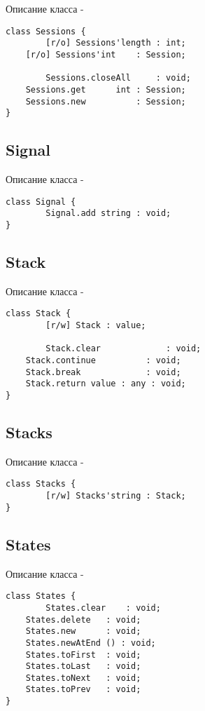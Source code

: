 \noindent Описание класса  -
\begin{lstlisting}[numbers=none]
class Sessions {
        [r/o] Sessions'length : int;
	[r/o] Sessions'int    : Session;
	
        Sessions.closeAll     : void;
	Sessions.get      int : Session;
	Sessions.new          : Session;
}
\end{lstlisting}

\subsection{{\color{orange} Signal}}

\noindent Описание класса  -
\begin{lstlisting}[numbers=none]
class Signal {
        Signal.add string : void;
}
\end{lstlisting}

\subsection{{\color{orange} Stack}}

\noindent Описание класса  -
\begin{lstlisting}[numbers=none]
class Stack {
        [r/w] Stack : value;
	
        Stack.clear             : void;
	Stack.continue          : void;
	Stack.break             : void;
	Stack.return value : any : void;
}
\end{lstlisting}

\subsection{{\color{orange} Stacks}}

\noindent Описание класса  -
\begin{lstlisting}[numbers=none]
class Stacks {
        [r/w] Stacks'string : Stack;
}
\end{lstlisting}

\subsection{{\color{orange} States}}

\noindent Описание класса  -
\begin{lstlisting}[numbers=none]
class States {
        States.clear    : void;
	States.delete   : void;
	States.new      : void;
	States.newAtEnd () : void;
	States.toFirst  : void;
	States.toLast   : void;
	States.toNext   : void;
	States.toPrev   : void;
}
\end{lstlisting}

